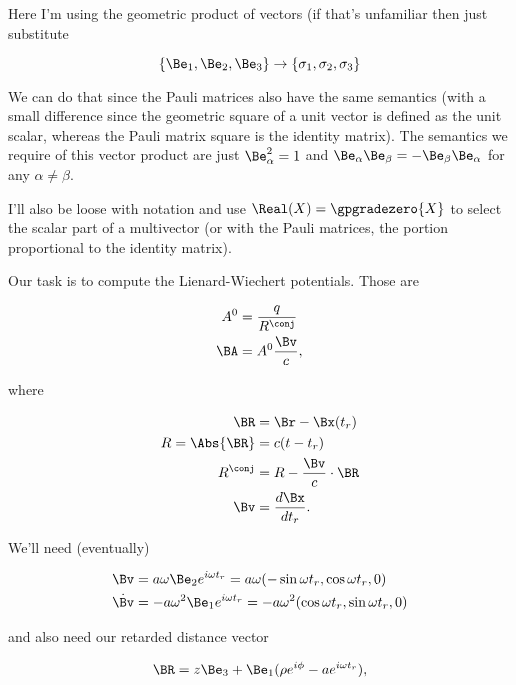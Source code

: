 Here I'm using the geometric product of vectors (if that's unfamiliar then just substitute

\begin{equation}\label{eqn:relativisticElectrodynamicsExamReflection:30}
\{\Be_1, \Be_2, \Be_3\} \rightarrow \{\sigma_1, \sigma_2, \sigma_3\}
\end{equation}

We can do that since the Pauli matrices also have the same semantics (with a small difference since the geometric square of a unit vector is defined as the unit scalar, whereas the Pauli matrix square is the identity matrix).  The semantics we require of this vector product are just $\Be_\alpha^2 = 1$ and $\Be_\alpha \Be_\beta = - \Be_\beta \Be_\alpha$ for any $\alpha \ne \beta$.

I'll also be loose with notation and use $\Real(X) = \gpgradezero{X}$ to select the scalar part of a multivector (or with the Pauli matrices, the portion proportional to the identity matrix).

Our task is to compute the Lienard-Wiechert potentials.  Those are

\begin{align}\label{eqn:relativisticElectrodynamicsExamReflection:50}
A^0 &= \frac{q}{R^\conj} \\
\BA &= A^0 \frac{\Bv}{c},
\end{align}

where

\begin{align}\label{eqn:relativisticElectrodynamicsExamReflection:70}
\BR &= \Br - \Bx(t_r) \\
R = \Abs{\BR} &= c (t - t_r) \\
R^\conj &= R - \frac{\Bv}{c} \cdot \BR \\
\Bv &= \frac{d\Bx}{dt_r}.
\end{align}

We'll need (eventually)

\begin{align}\label{eqn:relativisticElectrodynamicsExamReflection:90}
\Bv &= a \omega \Be_2 e^{i \omega t_r} = a \omega ( -\sin \omega t_r, \cos\omega t_r, 0) \\
\dot{\Bv} &= -a \omega^2 \Be_1 e^{i \omega t_r} = 
-a \omega^2 (\cos\omega t_r, \sin\omega t_r, 0)
\end{align}

and also need our retarded distance vector

\begin{equation}\label{eqn:relativisticElectrodynamicsExamReflection:110}
\BR = z \Be_3 + \Be_1 (\rho e^{i \phi} - a e^{i \omega t_r} ),
\end{equation}

